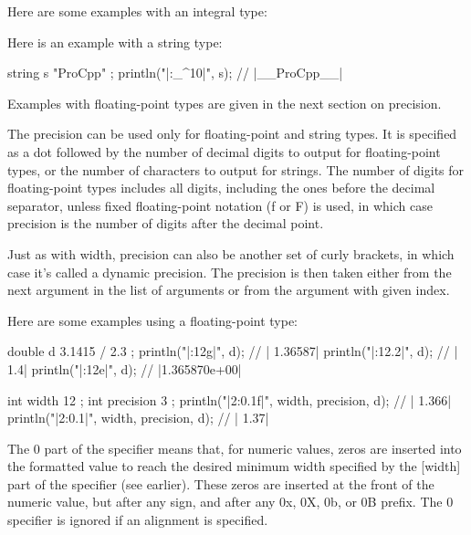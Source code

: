 Here are some examples with an integral type:


Here is an example with a string type:

\begin{cpp}
string s { "ProCpp" };
println("|{:_^10}|", s); // |__ProCpp__|
\end{cpp}

Examples with floating-point types are given in the next section on precision.


The precision can be used only for floating-point and string types. It is specified as a dot followed by the number of decimal digits to output for floating-point types, or the number of characters to output for strings. The number of digits for floating-point types includes all digits, including the ones before the decimal separator, unless fixed floating-point notation (f or F) is used, in which case precision is the number of digits after the decimal point.

Just as with width, precision can also be another set of curly brackets, in which case it’s called a dynamic precision. The precision is then taken either from the next argument in the list of arguments or from the argument with given index.

Here are some examples using a floating-point type:

\begin{cpp}
double d { 3.1415 / 2.3 };
println("|{:12g}|", d);   // |     1.36587|
println("|{:12.2}|", d);  // |         1.4|
println("|{:12e}|", d);   // |1.365870e+00|

int width { 12 };
int precision { 3 };
println("|{2:{0}.{1}f}|", width, precision, d); // |     1.366|
println("|{2:{0}.{1}}|", width, precision, d);  // |      1.37|
\end{cpp}


The 0 part of the specifier means that, for numeric values, zeros are inserted into the formatted value to reach the desired minimum width specified by the [width] part of the specifier (see earlier). These zeros are inserted at the front of the numeric value, but after any sign, and after any 0x, 0X, 0b, or 0B prefix. The 0 specifier is ignored if an alignment is specified.

